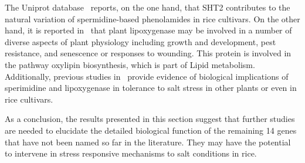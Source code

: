 The Uniprot database~\cite{uniprot2018uniprot} reports, on the one
hand, that SHT2 contributes to the natural variation of
spermidine-based phenolamides in rice cultivars. On the other hand, it
is reported in~\cite{uniprot2018uniprot} that plant lipoxygenase may
be involved in a number of diverse aspects of plant physiology
including growth and development, pest resistance, and senescence or
responses to wounding. This protein is involved in the pathway
oxylipin biosynthesis, which is part of Lipid metabolism. Additionally,
previous studies
%
in~\cite{gupta2013plant,hou2015persimmon,mittova2002salt,peng2019novel,roychoudhury2011amelioration}
%
provide evidence of biological implications of sperimidine and
lipoxygenase in tolerance to salt stress in other plants or even in
rice cultivars.

As a conclusion, the results presented in this section suggest that
further studies are needed to elucidate the detailed biological
function of the remaining 14 genes that have not been named so far in
the literature.  They may have the potential to intervene in stress
responsive mechanisms to salt conditions in rice.
